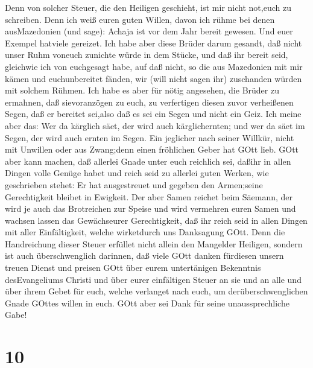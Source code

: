  Denn von solcher Steuer, die den Heiligen geschieht, ist
mir nicht not,euch zu schreiben.  Denn ich weiß euren guten
Willen, davon ich rühme bei denen ausMazedonien (und sage): Achaja ist
vor dem Jahr bereit gewesen. Und euer Exempel hatviele gereizet.
 Ich habe aber diese Brüder darum gesandt, daß nicht unser
Ruhm voneuch zunichte würde in dem Stücke, und daß ihr bereit seid,
gleichwie ich von euchgesagt habe,  auf daß nicht, so die
aus Mazedonien mit mir kämen und euchunbereitet fänden, wir (will nicht
sagen ihr) zuschanden würden mit solchem Rühmen.  Ich habe
es aber für nötig angesehen, die Brüder zu ermahnen, daß sievoranzögen
zu euch, zu verfertigen diesen zuvor verheißenen Segen, daß er bereitet
sei,also daß es sei ein Segen und nicht ein Geiz.  Ich meine
aber das: Wer da kärglich säet, der wird auch kärglichernten; und wer da
säet im Segen, der wird auch ernten im Segen.  Ein jeglicher
nach seiner Willkür, nicht mit Unwillen oder aus Zwang;denn einen
fröhlichen Geber hat GOtt lieb.  GOtt aber kann machen, daß
allerlei Gnade unter euch reichlich sei, daßihr in allen Dingen volle
Genüge habet und reich seid zu allerlei guten Werken,  wie
geschrieben stehet: Er hat ausgestreuet und gegeben den Armen;seine
Gerechtigkeit bleibet in Ewigkeit.  Der aber Samen reichet
beim Säemann, der wird je auch das Brotreichen zur Speise und wird
vermehren euren Samen und wachsen lassen das Gewächseurer Gerechtigkeit,
 daß ihr reich seid in allen Dingen mit aller
Einfältigkeit, welche wirketdurch uns Danksagung GOtt. 
Denn die Handreichung dieser Steuer erfüllet nicht allein den Mangelder
Heiligen, sondern ist auch überschwenglich darinnen, daß viele GOtt
danken fürdiesen unsern treuen Dienst  und preisen GOtt
über eurem untertänigen Bekenntnis desEvangeliums Christi und über eurer
einfältigen Steuer an sie und an alle  und über ihrem Gebet
für euch, welche verlanget nach euch, um derüberschwenglichen Gnade
GOttes willen in euch.  GOtt aber sei Dank für seine
unaussprechliche Gabe!

\hypertarget{section-9}{%
\section{10}\label{section-9}}

